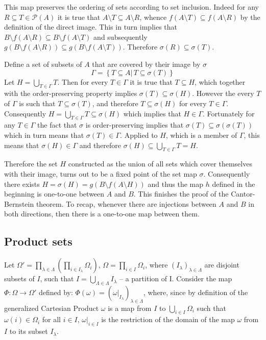 \documentclass[a4paper]{article}
\newcommand{\obj}[1]{\left\{{#1}\right\}}
\newcommand{\brac}[1]{{\left({#1}\right)}}
\begin{document}
This map preserves the ordering of sets according to set inclusion. Indeed for any $R\subseteq T\in\mathcal{P}\brac{A}$ it is true that $A\setminus T\subseteq A\setminus R$, whence $f(A\setminus T)\subseteq f(A\setminus R)$ by the definition of the direct image. This in turn implies that $B\setminus f(A\setminus R)\subseteq B\setminus f(A\setminus T)$ and subsequently $g(B\setminus f(A\setminus R))\subseteq g(B\setminus f(A\setminus T))$. Therefore $\sigma(R)\subseteq \sigma(T)$.

Define a set of subsets of $A$ that are covered by their image by $\sigma$ \[\Gamma = \obj{ T\subseteq A\vert\, T\subseteq \sigma(T) }\]
Let $H=\bigcup_{T\in \Gamma}T$. Then for every $T\in \Gamma$ it is true that $T\subseteq H$, which together with the order-preserving property implies $\sigma(T)\subseteq \sigma(H)$. However the every $T$ of $\Gamma$ is such that $T\subseteq \sigma(T)$, and therefore $T\subseteq \sigma(H)$ for every $T\in \Gamma$. Consequently $H=\bigcup_{T\in \Gamma}T\subseteq \sigma(H)$ which implies that $H\in \Gamma$.
Fortunately for any $T\in \Gamma$ the fact that $\sigma$ is order-preserving implies that $\sigma(T)\subseteq \sigma(\sigma(T))$ which in turn means that $\sigma(T)\in \Gamma$. Applied to $H$, which is a member of $\Gamma$, this means that $\sigma(H)\in \Gamma$ and therefore $\sigma(H)\subseteq \bigcup_{T\in \Gamma}T=H$.

Therefore the set $H$ constructed as the union of all sets which cover themselves with their image, turns out to be a fixed point of the set map $\sigma$. Consequently there exists $H=\sigma(H)=g(B\setminus f(A\setminus H))$ and thus the map $h$ defined in the beginning is one-to-one between $A$ and $B$. This finishes the proof of the Cantor-Bernstein theorem.
To recap, whenever there are injections between $A$ and $B$ in both directions, then there is a one-to-one map between them.



\subsection{Product sets} %
\label{sub:product_sets}

Let $\Omega' = \prod_{\lambda \in \Lambda}(\prod_{i \in I_\lambda}\Omega_i)$,  $\Omega = \prod_{i \in I}\Omega_i$, where $(I_\lambda)_{\lambda \in \Lambda}$ are disjoint subsets of $I$, such that $I = \bigcup_{\Lambda \in \Lambda}I_\lambda$ -- a partition of I. Consider the map $\Phi:\Omega \to \Omega'$ defined by: $\Phi(\omega) = (\omega\vert_{I_\lambda})_{\lambda \in \Lambda}$, where, since by definition of the generalized Cartesian Product $\omega$ is a map from $I$ to $\bigcup_{i \in I}\Omega_i$ such that $\omega(i) \in \Omega_i$ for all $i \in I$, $\omega\vert_{i \in I}$ is the restriction of the domain of the map $\omega$ from $I$ to its subset $I_\lambda$.
\end{document}
